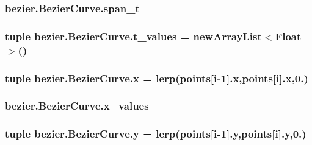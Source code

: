 \subsubsection[{span\+\_\+t}]{\setlength{\rightskip}{0pt plus 5cm}bezier.\+Bezier\+Curve.\+span\+\_\+t}\label{classbezier_1_1_bezier_curve_a79e5e878938d38339da6d3bebb7bf337}
\hypertarget{classbezier_1_1_bezier_curve_a668f0b24433e3b2c5ef87f69875a10c2}{}
\subsubsection[{t\+\_\+values}]{\setlength{\rightskip}{0pt plus 5cm}tuple bezier.\+Bezier\+Curve.\+t\+\_\+values = new\+Array\+List$<$Float$>$()\hspace{0.3cm}{\ttfamily [static]}}\label{classbezier_1_1_bezier_curve_a668f0b24433e3b2c5ef87f69875a10c2}
\hypertarget{classbezier_1_1_bezier_curve_a67d3887b8b38085157320f51305db83e}{}
\subsubsection[{x}]{\setlength{\rightskip}{0pt plus 5cm}tuple bezier.\+Bezier\+Curve.\+x = lerp({\bf points}\mbox{[}{\bf i}-\/1\mbox{]}.x,{\bf points}\mbox{[}{\bf i}\mbox{]}.x,0.)\hspace{0.3cm}{\ttfamily [static]}}\label{classbezier_1_1_bezier_curve_a67d3887b8b38085157320f51305db83e}
\hypertarget{classbezier_1_1_bezier_curve_abae064c2182ba700fb576355e7d15bab}{}
\subsubsection[{x\+\_\+values}]{\setlength{\rightskip}{0pt plus 5cm}bezier.\+Bezier\+Curve.\+x\+\_\+values}\label{classbezier_1_1_bezier_curve_abae064c2182ba700fb576355e7d15bab}
\hypertarget{classbezier_1_1_bezier_curve_a4daedd276ea223e485036f3ad346b33c}{}
\subsubsection[{y}]{\setlength{\rightskip}{0pt plus 5cm}tuple bezier.\+Bezier\+Curve.\+y = lerp({\bf points}\mbox{[}{\bf i}-\/1\mbox{]}.y,{\bf points}\mbox{[}{\bf i}\mbox{]}.y,0.)\hspace{0.3cm}{\ttfamily [static]}}\label{classbezier_1_1_bezier_curve_a4daedd276ea223e485036f3ad346b33c}
\hypertarget{classbezier_1_1_bezier_curve_a8bf9aa7947c5ff98a513b2119c3bebac}{}
